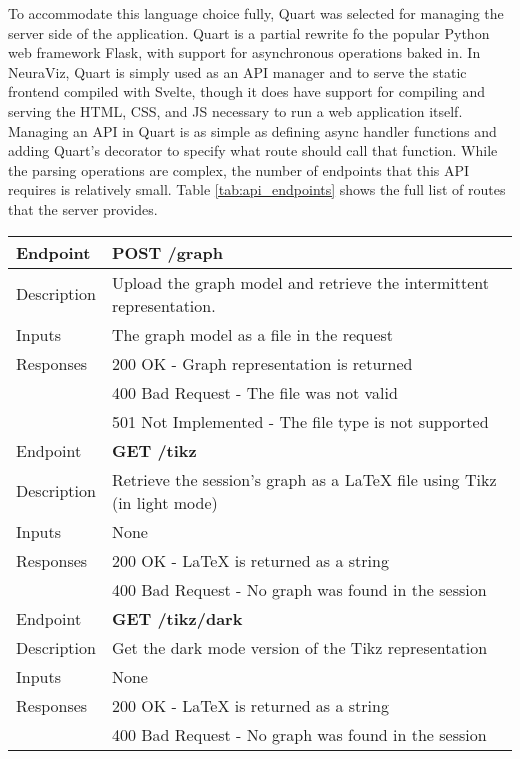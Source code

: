 To accommodate this language choice fully, Quart \cite{quart} was selected for managing the server side of the application. Quart is a partial rewrite fo the popular Python web framework Flask, with support for asynchronous operations baked in. In NeuraViz, Quart is simply used as an API manager and to serve the static frontend compiled with Svelte, though it does have support for compiling and serving the HTML, CSS, and JS necessary to run a web application itself. Managing an API in Quart is as simple as defining async handler functions and adding Quart's decorator to specify what route should call that function. While the parsing operations are complex, the number of endpoints that this API requires is relatively small. Table \ref{tab:api_endpoints} shows the full list of routes that the server provides.

\begin{center}
    \begin{tabular}{|l|l|}
        \hline
        \rowcolor{gray!40} Endpoint & \textbf{POST /graph} \\
        \hline
        Description & Upload the graph model and retrieve the intermittent representation. \\
        \hline
        Inputs & The graph model as a file in the request \\
        \hline
        Responses & 200 OK - Graph representation is returned \\
        & 400 Bad Request - The file was not valid \\
        & 501 Not Implemented - The file type is not supported \\
        \hline
        \rowcolor{gray!40} Endpoint & \textbf{GET /tikz}\\
        \hline
        Description & Retrieve the session's graph as a \LaTeX{} file using Tikz (in light mode) \\
        \hline
        Inputs & None \\
        \hline
        Responses & 200 OK - \LaTeX{} is returned as a string \\
        & 400 Bad Request - No graph was found in the session \\
        \hline
        \rowcolor{gray!40} Endpoint & \textbf{GET /tikz/dark} \\
        \hline 
        Description & Get the dark mode version of the Tikz representation \\
        \hline
        Inputs & None \\
        \hline
        Responses & 200 OK - \LaTeX{} is returned as a string \\
        & 400 Bad Request - No graph was found in the session \\
        \hline
    \end{tabular}
    \label{tab:api_endpoints}
\end{center}


